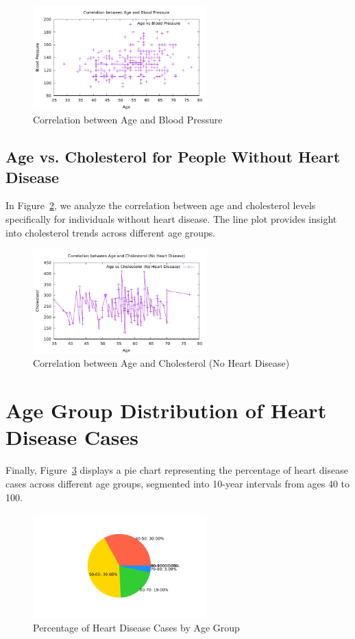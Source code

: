 \documentclass{article}
\begin{document}
	\begin{figure}[h]
		\centering
		\includegraphics[width=0.6\textwidth]{b.pdf}
		\caption{Correlation between Age and Blood Pressure}
		\label{fig:age_vs_bp}
	\end{figure}
	
	\subsection{Age vs. Cholesterol for People Without Heart Disease}
	In Figure~\ref{fig:age_vs_chol}, we analyze the correlation between age and cholesterol levels specifically for individuals without heart disease. The line plot provides insight into cholesterol trends across different age groups.
	
	\begin{figure}[h]
		\centering
		\includegraphics[width=0.6\textwidth]{c.pdf}
		\caption{Correlation between Age and Cholesterol (No Heart Disease)}
		\label{fig:age_vs_chol}
	\end{figure}
	
	\section{Age Group Distribution of Heart Disease Cases}
	Finally, Figure~\ref{fig:age_group_distribution} displays a pie chart representing the percentage of heart disease cases across different age groups, segmented into 10-year intervals from ages 40 to 100.
	
	\begin{figure}[h]
		\centering
		\includegraphics[width=0.6\textwidth]{d.pdf}
		\caption{Percentage of Heart Disease Cases by Age Group}
		\label{fig:age_group_distribution}
	\end{figure}
	
\end{document}
